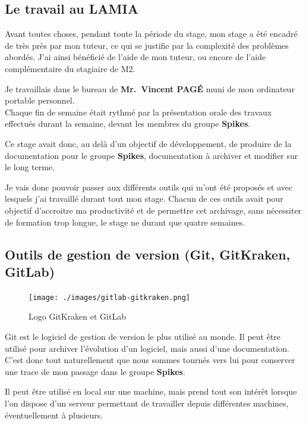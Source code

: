 \hypertarget{le-travail-au-lamia}{%
\subsection{Le travail au LAMIA}\label{le-travail-au-lamia}}

Avant toutes choses, pendant toute la période du stage, mon stage a été
encadré de très près par mon tuteur, ce qui se justifie par la
complexité des problèmes abordés. J'ai ainsi bénéficié de l'aide de mon
tuteur, ou encore de l'aide complémentaire du stagiaire de M2.

Je travaillais dans le bureau de \textbf{Mr.~Vincent PAGÉ} muni de mon
ordinateur portable personnel.\\
Chaque fin de semaine était rythmé par la présentation orale des travaux
effectués durant la semaine, devant les membres du groupe
\textbf{Spikes}.

Ce stage avait donc, au delà d'un objectif de développement, de produire
de la documentation pour le groupe \textbf{Spikes}, documentation à
archiver et modifier sur le long terme.

Je vais donc pouvoir passer aux différents outils qui m'ont été proposés
et avec lesquels j'ai travaillé durant tout mon stage. Chacun de ces
outils avait pour objectif d'accroitre ma productivité et de permettre
cet archivage, sans nécessiter de formation trop longue, le stage ne
durant que quatre semaines.

\hypertarget{outils-de-gestion-de-version-git-gitkraken-gitlab}{%
\subsection{Outils de gestion de version (Git, GitKraken,
GitLab)}\label{outils-de-gestion-de-version-git-gitkraken-gitlab}}

\begin{figure}[h!]
\label{fig:gitkraken}
\centering
\texttt{[image: ./images/gitlab-gitkraken.png]}
\caption{Logo GitKraken et GitLab}
\end{figure}

Git est le logiciel de gestion de version le plus utilisé au monde. Il
peut être utilisé pour archiver l'évolution d'un logiciel, mais aussi
d'une documentation. C'est donc tout naturellement que nous sommes
tournés vers lui pour conserver une trace de mon passage dans le groupe
\textbf{Spikes}.

Il peut être utilisé en local sur une machine, mais prend tout son
intérêt lorsque l'on dispose d'un serveur permettant de travailler
depuis différentes machines, éventuellement à plusieurs.

